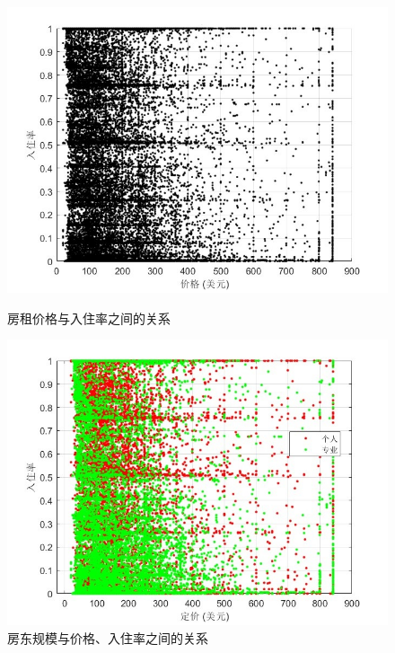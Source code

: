 \documentclass[12pt]{article}
\begin{document}
\begin{CJK}{UTF8}{gbsn}
	\begin{figure}[H]
		\begin{minipage}[b]{0.45\textwidth}
			\centering
			\includegraphics[width=\linewidth]{pic/9.jpg}
			\caption{房租价格与入住率之间的关系              }
			\label{fig:9}
		\end{minipage}
		\hfill
		\begin{minipage}[b]{0.45\textwidth}
			\centering
			\includegraphics[width=\linewidth]{pic/10.jpg}
			\caption{房东规模与价格、入住率之间的关系}
			\label{fig:10}
		\end{minipage}
	\end{figure}
	
	
	

\end{CJK}
\end{document}

